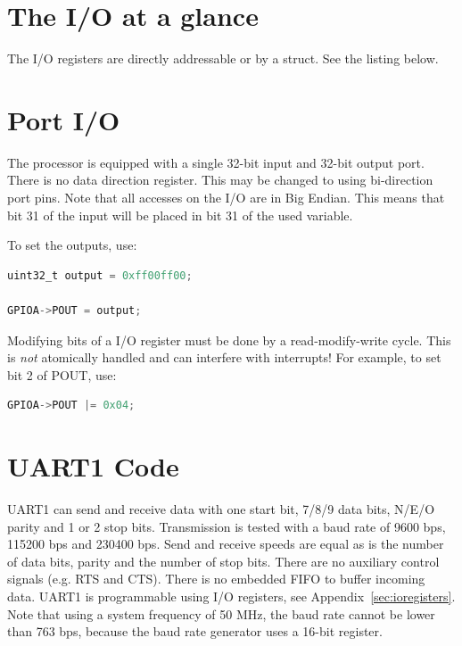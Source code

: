 \documentclass[12pt]{article}
\begin{document}


\section{The I/O at a glance}

The I/O registers are directly addressable or by a struct. See the listing below.



\section{Port I/O}
The processor is equipped with a single 32-bit input and 32-bit output port. There is no data direction register. This may be changed to using bi-direction port pins. Note that all accesses on the I/O are in Big Endian. This means that bit 31 of the input will be placed in bit 31 of the used variable.

To set the outputs, use:

\begin{lstlisting}[language=C]
uint32_t output = 0xff00ff00;

GPIOA->POUT = output;
\end{lstlisting}

Modifying bits of a I/O register must be done by a read-modify-write cycle. This is \emph{not} atomically handled and can interfere with interrupts! For example, to set bit 2 of POUT, use:

\begin{lstlisting}[language=C]
GPIOA->POUT |= 0x04;
\end{lstlisting}

\section{UART1 Code}

UART1 can send and receive data with one start bit, 7/8/9 data bits, N/E/O parity and 1 or 2 stop bits. Transmission is tested with a baud rate of 9600 bps, 115200 bps and 230400 bps. Send and receive speeds are equal as is the number of data bits, parity and the number of stop bits. There are no auxiliary control signals (e.g. RTS and CTS). There is no embedded FIFO to buffer incoming data. UART1 is programmable using I/O registers, see Appendix~\ref{sec:ioregisters}. Note that using a system frequency of 50 MHz, the baud rate cannot be lower than 763 bps, because the baud rate generator uses a 16-bit register.
\end{document}
